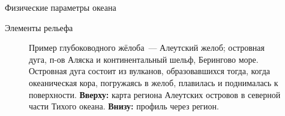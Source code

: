 \begin{chapter}{Физические параметры океана}
\begin{section}{Элементы рельефа}
\begin{description}
\begin{figure}[t!]
\caption{Пример глубоководного жёлоба~--- Алеутский желоб;
островная дуга, п-ов Аляска и континентальный шельф, Берингово море.
Островная дуга состоит из вулканов, образовавшихся тогда, когда
океаническая кора, погружаясь в желоб, плавилась и поднималась к
поверхности.
\textbf{Вверху:} карта региона Алеутских островов в северной части Тихого 
океана.
\textbf{Внизу:} профиль через регион.}
\label{fig:aleutiantrench}
\end{figure}
%
\end{description}


\end{section}
\end{chapter}
